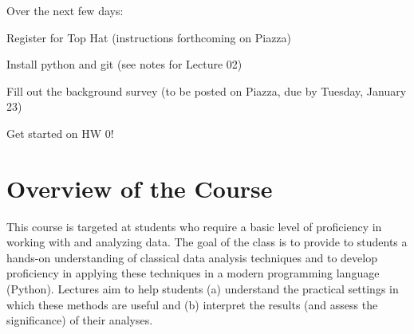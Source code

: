 \documentclass[11pt]{article}
\begin{document}
\noindent
Over the next few days:
\begin{compactitem}
\item Register for Top Hat (instructions forthcoming on Piazza)
\item Install python and git (see notes for Lecture 02)
\item Fill out the background survey (to be posted on Piazza, due
  by Tuesday, January 23)
\item Get started on  HW 0!
\end{compactitem}






\section*{Overview of the Course}

This course is targeted at students who require a basic level of
proficiency in working with and analyzing data.  %
The goal of the class is to provide to students a hands-on understanding
of classical data analysis techniques and to develop proficiency in
applying these techniques in a modern programming language (Python). 
%
%
Lectures aim to 
help 
students (a) understand the practical settings in which these methods are
useful and (b) interpret the results (and assess the significance) of their analyses.
\end{document}
